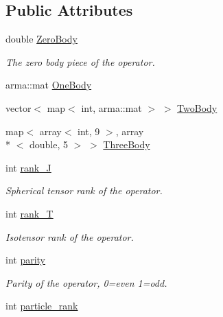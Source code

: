 \subsection*{Public Attributes}
\begin{DoxyCompactItemize}
\item 
\hypertarget{classOperator_a2f9f1109333a2485083cc7c090f9cd26}{double \hyperlink{classOperator_a2f9f1109333a2485083cc7c090f9cd26}{Zero\-Body}}\label{classOperator_a2f9f1109333a2485083cc7c090f9cd26}

\begin{DoxyCompactList}\small\item\em The zero body piece of the operator. \end{DoxyCompactList}\item 
arma\-::mat \hyperlink{classOperator_a14b1c78e0be45772aa57168c74d1b57c}{One\-Body}
\item 
vector$<$ map$<$ int, arma\-::mat $>$ $>$ \hyperlink{classOperator_a0778ed6b9b7b47e34f11fa187189c943}{Two\-Body}
\item 
map$<$ array$<$ int, 9 $>$, array\\*
$<$ double, 5 $>$ $>$ \hyperlink{classOperator_a5f5442cc5e6eb4f324283730145047f9}{Three\-Body}
\item 
\hypertarget{classOperator_a71a7c194800e2758c42ad0d5f30299aa}{int \hyperlink{classOperator_a71a7c194800e2758c42ad0d5f30299aa}{rank\-\_\-\-J}}\label{classOperator_a71a7c194800e2758c42ad0d5f30299aa}

\begin{DoxyCompactList}\small\item\em Spherical tensor rank of the operator. \end{DoxyCompactList}\item 
\hypertarget{classOperator_ac70ee8dbbc4cb4f61972575c68bb9a51}{int \hyperlink{classOperator_ac70ee8dbbc4cb4f61972575c68bb9a51}{rank\-\_\-\-T}}\label{classOperator_ac70ee8dbbc4cb4f61972575c68bb9a51}

\begin{DoxyCompactList}\small\item\em Isotensor rank of the operator. \end{DoxyCompactList}\item 
\hypertarget{classOperator_ad628e91e2dd2542c0f34e985271adcd3}{int \hyperlink{classOperator_ad628e91e2dd2542c0f34e985271adcd3}{parity}}\label{classOperator_ad628e91e2dd2542c0f34e985271adcd3}

\begin{DoxyCompactList}\small\item\em Parity of the operator, 0=even 1=odd. \end{DoxyCompactList}\item 
\hypertarget{classOperator_a44a74c03caff49e776433e885a724956}{int \hyperlink{classOperator_a44a74c03caff49e776433e885a724956}{particle\-\_\-rank}}\label{classOperator_a44a74c03caff49e776433e885a724956}


\end{DoxyCompactItemize}
